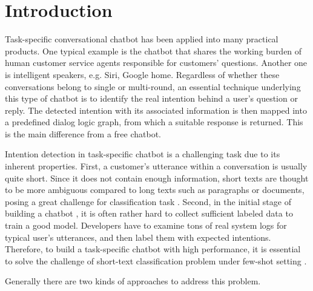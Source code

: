 \section{Introduction}
\label{sec:intro}

Task-specific  conversational  chatbot  \cite{wen2016network}  has been applied
into  many practical products. One typical example is the chatbot that shares the working burden of
human  customer  service  agents  responsible  for  customers' questions. 
Another one is intelligent  speakers, e.g. Siri, Google home. 
Regardless of whether these conversations belong to
single or  multi-round, an essential technique underlying this type of chatbot is to
identify  the  real  intention  behind  a  user's  question or reply. 
The detected intention  with  its  associated  information  is then mapped into a
predefined dialog logic graph, from which a suitable response is returned.
This  is  the  main  difference  from  a  free chatbot.  

Intention detection in task-specific chatbot  is  a  challenging task due to its inherent properties. First,
a customer's  utterance  within  a conversation is usually quite short. Since it
does  not  contain  enough  information,  short  texts \cite{song2014short} are
thought  to  be  more  ambiguous  compared to long texts such as paragraphs or
documents,  posing  a  great challenge \cite{chen2019deep} for classification
task   \cite{phan2008learning,yan2009dynamic,hua2015short}.   Second,  in  the
initial  stage  of  building  a  chatbot , it is often rather hard to collect
sufficient  labeled  data  to  train  a good model. Developers have to
examine tons of real system logs for typical user's utterances, and then label
them  with expected intentions. Therefore, to build a task-specific chatbot with
high  performance, it is essential to solve the challenge of short-text
classification   \cite{sriram2010short}   problem   under   few-shot   setting
\cite{yu2018diverse}.


Generally  there  are  two  kinds  of  approaches  to  address  this  problem.


